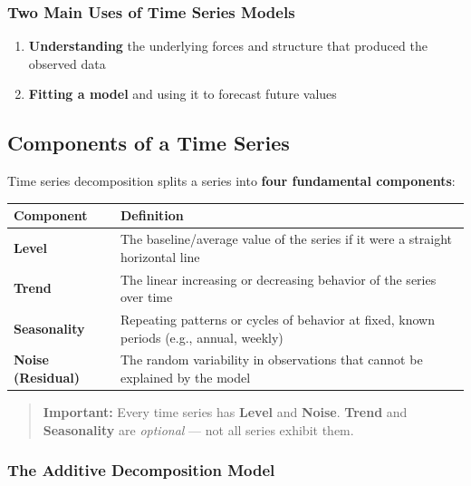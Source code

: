 \documentclass[12pt,openany]{book}
\begin{document}
\subsubsection{Two Main Uses of Time Series Models}

\begin{enumerate}[leftmargin=*]
    \item \textbf{Understanding} the underlying forces and structure that produced the observed data
    \item \textbf{Fitting a model} and using it to forecast future values
\end{enumerate}

\subsection{Components of a Time Series}

Time series decomposition splits a series into \textbf{four fundamental components}:

\begin{center}
\begin{tabular}{|L{0.28\textwidth}|L{0.62\textwidth}|}
\hline
Component & Definition \\
\hline
\textbf{Level} & The baseline/average value of the series if it were a straight horizontal line \\
\hline
\textbf{Trend} & The linear increasing or decreasing behavior of the series over time \\
\hline
\textbf{Seasonality} & Repeating patterns or cycles of behavior at fixed, known periods (e.g., annual, weekly) \\
\hline
\textbf{Noise (Residual)} & The random variability in observations that cannot be explained by the model \\
\hline
\end{tabular}
\end{center}

\begin{quote}
\textbf{Important:} Every time series has \textbf{Level} and \textbf{Noise}. \textbf{Trend} and \textbf{Seasonality} are \textit{optional} --- not all series exhibit them.\par

\end{quote}

\subsubsection{The Additive Decomposition Model}
\end{document}
